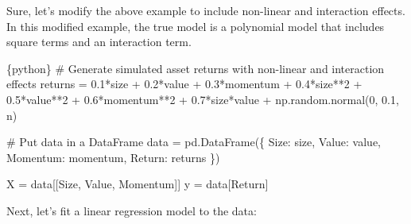 \documentclass[
  letterpaper,
  DIV=11,
  numbers=noendperiod]{scrartcl}
\newenvironment{Shaded}{\begin{snugshade}}{\end{snugshade}}
\newcommand{\CommentTok}[1]{\textcolor[rgb]{0.37,0.37,0.37}{#1}}
\newcommand{\DecValTok}[1]{\textcolor[rgb]{0.68,0.00,0.00}{#1}}
\newcommand{\FloatTok}[1]{\textcolor[rgb]{0.68,0.00,0.00}{#1}}
\newcommand{\InformationTok}[1]{\textcolor[rgb]{0.37,0.37,0.37}{#1}}
\newcommand{\NormalTok}[1]{\textcolor[rgb]{0.00,0.23,0.31}{#1}}
\newcommand{\OperatorTok}[1]{\textcolor[rgb]{0.37,0.37,0.37}{#1}}
\newcommand{\StringTok}[1]{\textcolor[rgb]{0.13,0.47,0.30}{#1}}
\begin{document}
Sure, let's modify the above example to include non-linear and
interaction effects. In this modified example, the true model is a
polynomial model that includes square terms and an interaction term.

\begin{Shaded}
\begin{Highlighting}[]
\InformationTok{\textasciigrave{}\textasciigrave{}\textasciigrave{}\{python\}}
\CommentTok{\# Generate simulated asset returns with non{-}linear and interaction effects}
\NormalTok{returns }\OperatorTok{=} \FloatTok{0.1}\OperatorTok{*}\NormalTok{size }\OperatorTok{+} \FloatTok{0.2}\OperatorTok{*}\NormalTok{value }\OperatorTok{+} \FloatTok{0.3}\OperatorTok{*}\NormalTok{momentum }\OperatorTok{+} \FloatTok{0.4}\OperatorTok{*}\NormalTok{size}\OperatorTok{**}\DecValTok{2} \OperatorTok{+} \FloatTok{0.5}\OperatorTok{*}\NormalTok{value}\OperatorTok{**}\DecValTok{2} \OperatorTok{+} \FloatTok{0.6}\OperatorTok{*}\NormalTok{momentum}\OperatorTok{**}\DecValTok{2} \OperatorTok{+} \FloatTok{0.7}\OperatorTok{*}\NormalTok{size}\OperatorTok{*}\NormalTok{value }\OperatorTok{+}\NormalTok{ np.random.normal(}\DecValTok{0}\NormalTok{, }\FloatTok{0.1}\NormalTok{, n)}

\CommentTok{\# Put data in a DataFrame}
\NormalTok{data }\OperatorTok{=}\NormalTok{ pd.DataFrame(\{}
    \StringTok{\textquotesingle{}Size\textquotesingle{}}\NormalTok{: size,}
    \StringTok{\textquotesingle{}Value\textquotesingle{}}\NormalTok{: value,}
    \StringTok{\textquotesingle{}Momentum\textquotesingle{}}\NormalTok{: momentum,}
    \StringTok{\textquotesingle{}Return\textquotesingle{}}\NormalTok{: returns}
\NormalTok{\})}

\NormalTok{X }\OperatorTok{=}\NormalTok{ data[[}\StringTok{\textquotesingle{}Size\textquotesingle{}}\NormalTok{, }\StringTok{\textquotesingle{}Value\textquotesingle{}}\NormalTok{, }\StringTok{\textquotesingle{}Momentum\textquotesingle{}}\NormalTok{]]}
\NormalTok{y }\OperatorTok{=}\NormalTok{ data[}\StringTok{\textquotesingle{}Return\textquotesingle{}}\NormalTok{]}
\InformationTok{\textasciigrave{}\textasciigrave{}\textasciigrave{}}
\end{Highlighting}
\end{Shaded}

Next, let's fit a linear regression model to the data:
\end{document}
